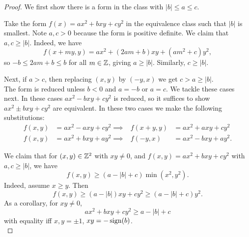 \begin{proof}
 We first show there is a form in the class with $|b|\le a\le c$.

Take the form $f(x)=ax^2+bxy+cy^2$ in the equivalence class such that $|b|$ is smallest. Note $a,c> 0$ because the form is positive definite. We claim that $a,c\ge|b|$. Indeed, we have
\[
f(x+my,y)=ax^2+(2am+b)xy+(am^2+c)y^2,
\]
so $-b\le 2am+b\le b$ for all $m\in \mathbb{Z}$, giving $a \ge|b|$. Similarly, $c\ge |b|$.

Next, if $a>c$, then %
replacing $(x,y)$ by $(-y,x)$ we get $c>a\ge|b|$.\\

 The form is reduced unless $b<0$ and $a=-b$ or $a=c$. We tackle these cases next. In these cases $ax^2-bxy+cy^2$ is reduced, so it suffices to show $ax^2\pm bxy +cy^2$ are equivalent. In these two cases we make the following substitutions:
\begin{align*}
f(x,y)&=ax^2-axy+cy^2\implies& f(x+y,y)&=ax^2+axy+cy^2\\
f(x,y)&=ax^2+bxy+ay^2\implies & f(-y,x)&=ax^2-bxy+ay^2.
\end{align*}

 We claim that for $(x,y)\in \mathbb{Z}^2$ with $xy\ne 0$, and $f(x,y)=ax^2+bxy+cy^2$ with $a,c\ge |b|$, we have 
\[
f(x,y)\ge (a-|b|+c)\min(x^2,y^2).
\]
Indeed, \wog{} assume $x\ge y$. Then
\[
f(x,y)\ge (a-|b|)xy+cy^2\ge(a-|b|+c)y^2.
\]
As a corollary, for $xy\ne 0$,
\[
ax^2+bxy+cy^2\ge a-|b|+c
\]
with equality iff $x,y=\pm1$, $xy=-\operatorname{sign}(b)$.\\


\end{proof}
